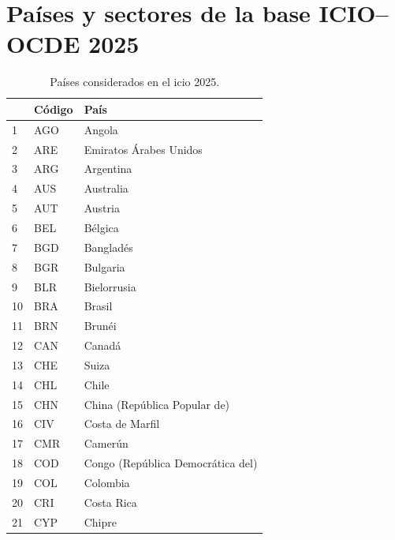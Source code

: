 \chapter{Países y sectores de la base ICIO--OCDE 2025}\label{anexo1}

\setlength{\LTleft}{\fill}
\setlength{\LTright}{\fill}

\begin{longtable}{lll}
	\caption{Países considerados en el \gls{icio} 2025.}
	\label{ICIO25_Paises}\\
	\hline
	& \textbf{Código} & \textbf{País}\\
	\hline
	\endhead
	\hline
	\endfoot
	\endlastfoot
	1  & AGO    & Angola                               \\
	2  & ARE    & Emiratos Árabes Unidos               \\
	3  & ARG    & Argentina                            \\
	4  & AUS    & Australia                            \\
	5  & AUT    & Austria                              \\
	6  & BEL    & Bélgica                              \\
	7  & BGD    & Bangladés                            \\
	8  & BGR    & Bulgaria                             \\
	9  & BLR    & Bielorrusia                          \\
	10 & BRA    & Brasil                               \\
	11 & BRN    & Brunéi                               \\
	12 & CAN    & Canadá                               \\
	13 & CHE    & Suiza                                \\
	14 & CHL    & Chile                                \\
	15 & CHN    & China (República Popular de)         \\
	16 & CIV    & Costa de Marfil                      \\
	17 & CMR    & Camerún                              \\
	18 & COD    & Congo (República Democrática del)    \\
	19 & COL    & Colombia                             \\
	20 & CRI    & Costa Rica                           \\
	21 & CYP    & Chipre                               \\

\end{longtable}
